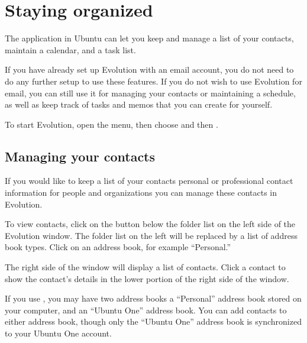 \section{Staying organized}

The  application in Ubuntu can let you keep and manage
a list of your contacts, maintain a calendar, and a task list.

If you have already set up Evolution with an email account, you do not need
to do any further setup to use these features. If you do not wish to use
Evolution for email, you can still use it for managing your contacts or 
maintaining a schedule, as well as keep track of tasks and memos that you can
create for yourself.

To start Evolution, open the  menu, then choose 
 and then .


\subsection{Managing your contacts}



If you would like to keep a list of your contacts \dash personal or 
professional contact information for people and organizations \dash you can 
manage these contacts in Evolution.

To view contacts, click on the  button below the folder
list on the left side of the Evolution window. The folder list on the left
will be replaced by a list of address book types. Click on an address book,
for example ``Personal.''

The right side of the window will display a list of contacts. Click a contact
to show the contact's details in the lower portion of the right side of the
window.

If you use , you may have two address books 
\dash a ``Personal'' address book stored on your computer, 
and an ``Ubuntu One'' address book. You can add contacts to either address
book, though only the ``Ubuntu One'' address book is synchronized to your
Ubuntu One account.

